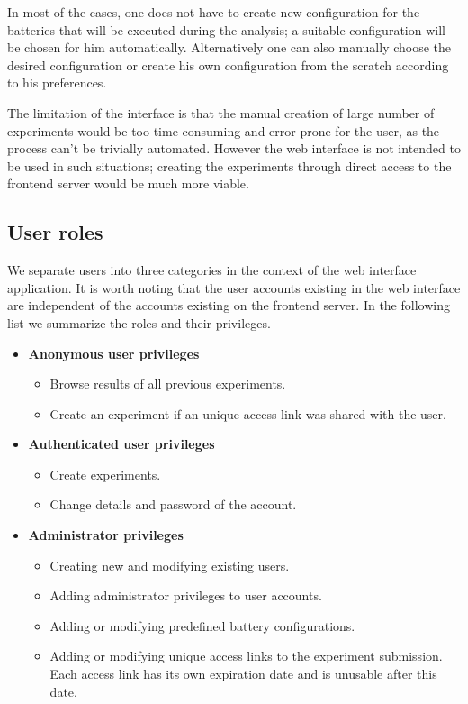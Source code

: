 \documentclass[
	digital,    %
	oneside,    %
	color,
	11pt,
	nocover,
	notable,
	nolof,
	nolot,
]{fithesis3}
\theoremstyle{definition}
\theoremstyle{remark}
\begin{document}
In most of the cases, one does not have to create new configuration for the batteries that will be executed during the analysis; a suitable configuration will be chosen for him automatically. Alternatively one can also manually choose the desired configuration or create his own configuration from the scratch according to his preferences.

The limitation of the interface is that the manual creation of large number of experiments would be too time-consuming and error-prone for the user, as the process can't be trivially automated. However the web interface is not intended to be used in such situations; creating the experiments through direct access to the frontend server would be much more viable. 

\subsection*{User roles}
We separate users into three categories in the context of the web interface application. It is worth noting that the user accounts existing in the web interface are independent of the accounts existing on the frontend server. In the following list we summarize the roles and their privileges.

\begin{itemize}
\item \textbf{Anonymous user privileges}
\begin{itemize}
\item Browse results of all previous experiments.
\item Create an experiment if an unique access link was shared with the user.
\end{itemize}
\item \textbf{Authenticated user privileges}
\begin{itemize}
\item Create experiments.
\item Change details and password of the account.
\end{itemize}
\item \textbf{Administrator privileges}
\begin{itemize}
\item Creating new and modifying existing users.
\item Adding administrator privileges to user accounts.
\item Adding or modifying predefined battery configurations.
\item Adding or modifying unique access links to the experiment submission. Each access link has its own expiration date and is unusable after this date.
\end{itemize}
\end{itemize}
\end{document}
